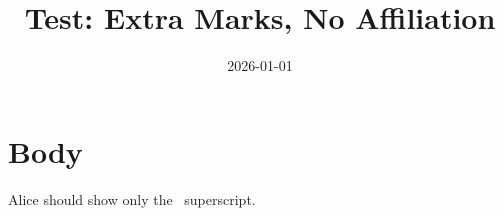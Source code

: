 \documentclass{article}
\title{Test: Extra Marks, No Affiliation}
\date{2026-01-01}
\begin{document}
\maketitle
\section{Body}
Alice should show only the \textdagger\ superscript.
\end{document}
